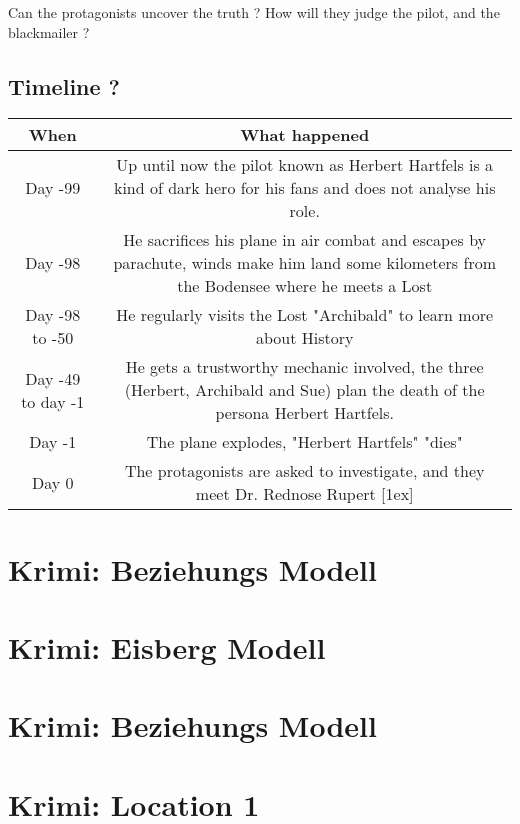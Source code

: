 Can the protagonists uncover the truth ? How will they judge the pilot, and the blackmailer ?

\subsection{Timeline ?}

\begin{center}
    \begin{tabular}{|c c|}
    \hline
     When & What happened \\ [0.5ex]
     \hline\hline
     Day -99 & Up until now the pilot known as Herbert Hartfels is a kind of dark hero for his fans and does not analyse his role. \\
     \hline
     Day -98 & He sacrifices his plane in air combat and escapes by parachute, winds make him land some kilometers from the Bodensee where he meets a Lost \\
     \hline
     Day -98 to -50 & He regularly visits the Lost "Archibald"  to learn more about History \\
     \hline
     Day -49 to day -1 & He gets a trustworthy mechanic involved, the three (Herbert, Archibald and Sue) plan the death of the persona Herbert Hartfels. \\
     \hline
     Day -1 & The plane explodes, "Herbert Hartfels" "dies" \\
     \hline
     Day 0 & The protagonists are asked to investigate, and they meet Dr. Rednose Rupert [1ex]
    \hline
    \end{tabular}
    \end{center}

\section{Krimi: Beziehungs Modell}

\section{Krimi: Eisberg Modell}

\section{Krimi: Beziehungs Modell}

\section{Krimi: Location 1}


